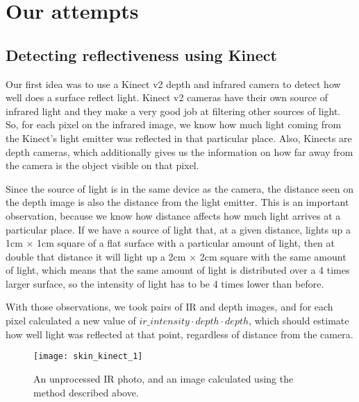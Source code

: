     \section{Our attempts}

        \subsection{Detecting reflectiveness using Kinect}
            Our first idea was to use a Kinect v2 depth and infrared camera to detect
            how well does a surface reflect light.
            Kinect v2 cameras have their own source of infrared light and they make
            a very good job at filtering other sources of light.
            So, for each pixel on the infrared image, we know how much light coming
            from the Kinect's light emitter was reflected in that particular place.
            Also, Kinects are depth cameras, which additionally gives us the information
            on how far away from the camera is the object visible on that pixel.

            Since the source of light is in the same device as the camera, the distance
            seen on the depth image is also the distance from the light emitter.
            This is an important observation, because we know how distance affects how
            much light arrives at a particular place. %
            If we have a source of light that, at a given distance, lights up a
            1cm $\times$ 1cm square of a flat surface with a particular amount
            of light, then at double that distance it will light up a 2cm $\times$ 2cm
            square with the same amount of light, which means that the same amount
            of light is distributed over a 4 times larger surface, so the
            intensity of light has to be 4 times lower than before.

            With those observations, we took pairs of IR and depth images, and for each
            pixel calculated a new value of $ir\_intensity \cdot depth \cdot depth$,
            which should estimate how well light was reflected at that point,
            regardless of distance from the camera.

            \begin{figure}[H]
                \caption{An unprocessed IR photo, and an image calculated using
                the method described above.}
                \centering
                \texttt{[image: skin\_kinect\_1]}
                \label{fig:skin_kinect_1}
            \end{figure}

